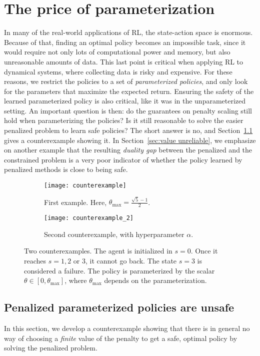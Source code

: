 \section{The price of parameterization} \label{sec:parameterization}
In many of the real-world applications of RL, the state-action space is enormous. Because of that, finding an optimal policy becomes an impossible task, since it would require not only lots of computational power and memory, but also unreasonable amounts of data. This last point is critical when applying RL to dynamical systems, where collecting data is risky and expensive. For these reasons, we restrict the policies to a set of\emph{ parameterized policies}, and only look for the parameters that maximize the expected return. Ensuring the safety of the learned parameterized policy is also critical, like it was in the unparameterized setting. An important question is then: do the guarantees on penalty scaling still hold when parameterizing the policies? Is it still reasonable to solve the easier penalized problem to learn safe policies? The short answer is no, and Section~\ref{sec:unsafe parameterized} gives a counterexample showing it. In Section~\ref{sec:value unreliable}, we emphasize on another example that the resulting\emph{ duality gap} between the penalized and the constrained problem is a very poor indicator of whether the policy learned by penalized methods is close to being safe.

\begin{figure}
	\centering
	\begin{subfigure}{\textwidth}
		\centering
		\texttt{[image: counterexample]}
		\caption{First example. Here, $\theta_\text{max} = \frac{\sqrt{5}-1}{2}$.}
		\label{fig:counterexample 1}
	\end{subfigure}
	\begin{subfigure}{\textwidth}
		\centering
		\texttt{[image: counterexample\_2]}
		\caption{Second counterexample, with hyperparameter $\alpha$.}
		\label{fig:counterexample 2}
	\end{subfigure}
	\caption{Two counterexamples. The agent is initialized in $s=0$. Once it reaches $s=1, 2$ or $3$, it cannot go back. The state $s=3$ is considered a failure. The policy is parameterized by the scalar $\theta\in[0, \theta_{\text{max}}]$, where $\theta_\text{max}$ depends on the parameterization.}
	\label{fig:counterexamples}
\end{figure}

\subsection{Penalized parameterized policies are unsafe} \label{sec:unsafe parameterized}
In this section, we develop a counterexample showing that there is in general no way of choosing a\emph{ finite} value of the penalty to get a safe, optimal policy by solving the penalized problem.

